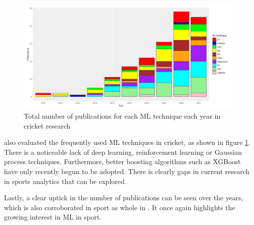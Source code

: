 \documentclass[12pt,a4paper]{report}
\theoremstyle{definition}
\begin{document}
\begin{figure}[H]
    \centering
    \includegraphics[width=\linewidth]{ML_techniques_cricket.png}
    \caption{Total number of publications for each ML technique each year in cricket research \citep{Wickramasinghe2022}}
    \label{fig:NoPapersCricket}
\end{figure}

\citet{Wickramasinghe2022} also evaluated the frequently used ML techniques in cricket, as shown in figure \ref{fig:NoPapersCricket}. 
There is a noticeable lack of deep learning, reinforcement learning or Gaussian process techniques.
Furthermore, better boosting algorithms such as XGBoost have only recently begun to be adopted.
There is clearly gaps in current research in sports analytics that can be explored.

Lastly, a clear uptick in the number of publications can be seen over the years, which is also corroborated in sport as whole in \citet{horvat2020}.
It once again highlights the growing interest in ML in sport.

%
%
\end{document}
